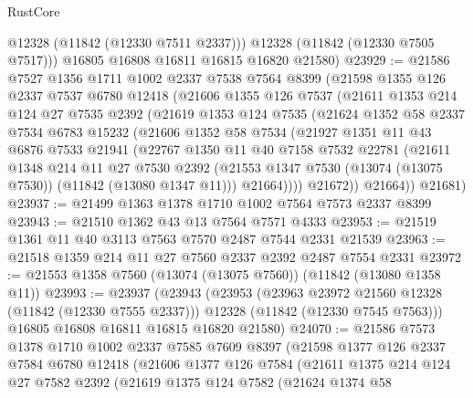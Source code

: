 \begin{lexlean}{RustCore}
\begin{coremodule}
          @12328
          (@11842 (@12330 @7511 @2337)))
        @12328
        (@11842 (@12330 @7505 @7517)))
      @16805
      @16808
      @16811
      @16815
      @16820
      @21580)
@23929 := @21586
    @7527
    @1356
    @1711
    @1002
    @2337
    @7538
    @7564
    @8399
    (@21598
      @1355
      @126
      @2337
      @7537
      @6780
      @12418
      (@21606
        @1355
        @126
        @7537
        (@21611
          @1353
          @214
          @124
          @27
          @7535
          @2392
          (@21619
            @1353
            @124
            @7535
            (@21624
              @1352
              @58
              @2337
              @7534
              @6783
              @15232
              (@21606
                @1352
                @58
                @7534
                (@21927
                  @1351
                  @11
                  @43
                  @6876
                  @7533
                  @21941
                  (@22767
                    @1350
                    @11
                    @40
                    @7158
                    @7532
                    @22781
                    (@21611
                      @1348
                      @214
                      @11
                      @27
                      @7530
                      @2392
                      (@21553 @1347 @7530 (@13074 (@13075 @7530)) (@11842 (@13080 @1347 @11)))
                      @21664))))
              @21672))
          @21664))
      @21681)
@23937 := @21499 @1363 @1378 @1710 @1002 @7564 @7573 @2337 @8399
@23943 := @21510 @1362 @43 @13 @7564 @7571 @4333
@23953 := @21519 @1361 @11 @40 @3113 @7563 @7570 @2487 @7544 @2331 @21539
@23963 := @21518 @1359 @214 @11 @27 @7560 @2337 @2392 @2487 @7554 @2331
@23972 := @21553 @1358 @7560 (@13074 (@13075 @7560)) (@11842 (@13080 @1358 @11))
@23993 := @23937
    (@23943
      (@23953
        (@23963 @23972 @21560 @12328 (@11842 (@12330 @7555 @2337)))
        @12328
        (@11842 (@12330 @7545 @7563)))
      @16805
      @16808
      @16811
      @16815
      @16820
      @21580)
@24070 := @21586
    @7573
    @1378
    @1710
    @1002
    @2337
    @7585
    @7609
    @8397
    (@21598
      @1377
      @126
      @2337
      @7584
      @6780
      @12418
      (@21606
        @1377
        @126
        @7584
        (@21611
          @1375
          @214
          @124
          @27
          @7582
          @2392
          (@21619
            @1375
            @124
            @7582
            (@21624
              @1374
              @58

\end{coremodule}
\end{lexlean}
